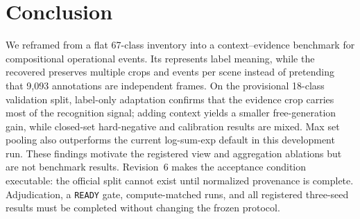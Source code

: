\section{Conclusion}

We reframed \dataset from a flat 67-class inventory into a context--evidence benchmark for compositional operational events. Its \eventgraph represents label meaning, while the recovered \samplegraph preserves multiple crops and events per scene instead of pretending that 9,093 annotations are independent frames. On the provisional 18-class validation split, label-only adaptation confirms that the evidence crop carries most of the recognition signal; adding context yields a smaller free-generation gain, while closed-set hard-negative and calibration results are mixed. Max set pooling also outperforms the current log-sum-exp default in this development run. These findings motivate the registered view and aggregation ablations but are not benchmark results. Revision~6 makes the acceptance condition executable: the official split cannot exist until normalized provenance is complete. Adjudication, a \texttt{READY} gate, compute-matched runs, and all registered three-seed results must be completed without changing the frozen protocol.
